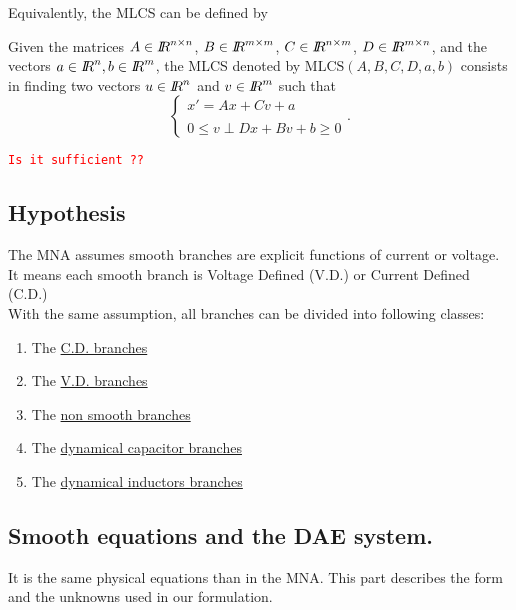 Equivalently, the MLCS can be defined by 

\begin{definition} 
  Given the matrices  ${A} \in \mbox{\rm $I\!\!R$}^{n \times n}$, ${B} \in \mbox{\rm $I\!\!R$}^{m \times m}$, ${C} \in \mbox{\rm $I\!\!R$}^{n \times m}$, ${D} \in \mbox{\rm $I\!\!R$}^{m \times n}$, and the vectors  $ {a} \in \mbox{\rm $I\!\!R$}^n, {b} \in \mbox{\rm $I\!\!R$}^m$, the MLCS denoted by $\mathrm{MLCS}(A,B,C,D,a,b)$ consists in finding two vectors $ {u} \in \mbox{\rm $I\!\!R$}^n$ and  $ {v} \in \mbox{\rm $I\!\!R$}^m$ such that
\begin{equation}\label{eq:mlcp1} 
  \begin{cases}
   x' = A x + C v + a  \\  \\
   {0} \le {v} \perp     Dx +B v +b   \ge {0}
  \end{cases}.
\end{equation}
\end{definition}

\textcolor{red}{\tt Is it sufficient ??}
\subsection{Hypothesis}
The MNA assumes smooth branches are explicit functions of current or voltage. It means each smooth
branch is Voltage Defined (V.D.) or Current Defined (C.D.)\\

With the same assumption, all branches can be divided into following classes:\\
\begin{enumerate}
\item The  \underline{C.D. branches} 
\item The  \underline{V.D. branches}
 \item The  \underline{non smooth branches}
 \item The \underline{dynamical capacitor branches}
 \item The \underline{dynamical inductors branches}
\end{enumerate}



\subsection{Smooth equations and the DAE system.}
It is the same physical equations than in the MNA. This part describes the form and the unknowns
used in our formulation.

